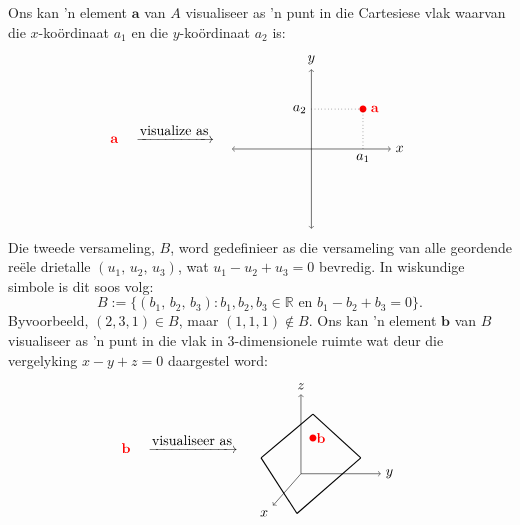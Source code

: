 \documentclass[a4paper,11pt]{book}
\theoremstyle{definition}
\newcommand{\be}{\begin{equation}}
\newcommand{\ee}{\end{equation}}
\newcommand{\ve}[1]{\mathbf{#1}}
\begin{document}
Ons kan 'n element $\ve{a}$ van $A$ visualiseer as 'n punt in die
Cartesiese vlak waarvan die $x$-ko{\"o}rdinaat $a_1$ en die
$y$-ko{\"o}rdinaat $a_2$ is:
\begin{align*}
{\color{red} \ve{a}} \quad \xrightarrow{\mbox{visualize as}} \quad
\begin{tikzpicture}[baseline={([yshift=-.5ex]current bounding box.center)},vertex/.style={anchor=base,
	circle,fill=black!25,minimum size=18pt,inner sep=2pt}]
\draw[<->] (-2, 0) -- (2,0) node[right] {$x$};
\draw[<->] (0, -2) -- (0, 2) node[above] {$y$};
\node [circle, fill=black, inner sep=0pt, minimum size=5pt, color=red] (P) at (1.3, 1) {};
\draw[dotted] (1.3, 0) node[below] {$a_1$} -- (1.3, 1);
\draw[dotted] (0, 1) node[left] {$a_2$} -- (1.3, 1);
\node[color=red] at (1.6,1) {$\ve{a}$};
\end{tikzpicture}
\end{align*}
Die tweede versameling, $B$, word gedefinieer as die versameling van alle
geordende re{\"e}le drietalle $(u_1, \, u_2, \, u_3)$, wat $u_1 - u_2 + u_3
= 0$ bevredig. In wiskundige simbole is dit soos volg:
\be
B := \{ (b_1, \, b_2, \, b_3) : b_1, b_2, b_3 \in \mathbb{R} \mbox{ en }
b_1 - b_2 + b_3 = 0\} .
\ee
Byvoorbeeld, $(2,3, 1) \in B$, maar $(1,1,1) \notin B$. Ons kan 'n element
$\ve{b}$ van $B$ visualiseer as 'n punt in die vlak in 3-dimensionele
ruimte wat deur die vergelyking $x-y+z = 0$ daargestel word:
\begin{align*}
{\color{red} \ve{b}} \quad \xrightarrow{\mbox{visualiseer as}} \quad
\begin{tikzpicture}[baseline={([yshift=-.5ex]current bounding box.center)},vertex/.style={anchor=base,
	circle,fill=black!25,minimum size=18pt,inner sep=2pt}]
\draw[->] (0, 0) -- (2,0) node[right] {$y$};
\draw[->] (0, 0) -- (0, 2) node[above] {$z$};
\draw[->] (0,0) -- (-0.7, -0.8) node[below left] {$x$};
\node [circle, fill=red, inner sep=0pt, minimum size=5pt] (P) at (0.3, 0.9) {};
\node[color=red] at (0.5, 0.9) {$\ve{b}$};
\draw[thick] (-0.1, -1) -- (-1, 0.4);
\draw[thick] (-1, 0.4) -- (0.3, 1.5);
\draw[thick] (0.3, 1.5) -- (1.5, 0.4);
\draw[thick] (1.5, 0.4) -- (-0.1, -1);
\end{tikzpicture}
\end{align*}
\end{document}
